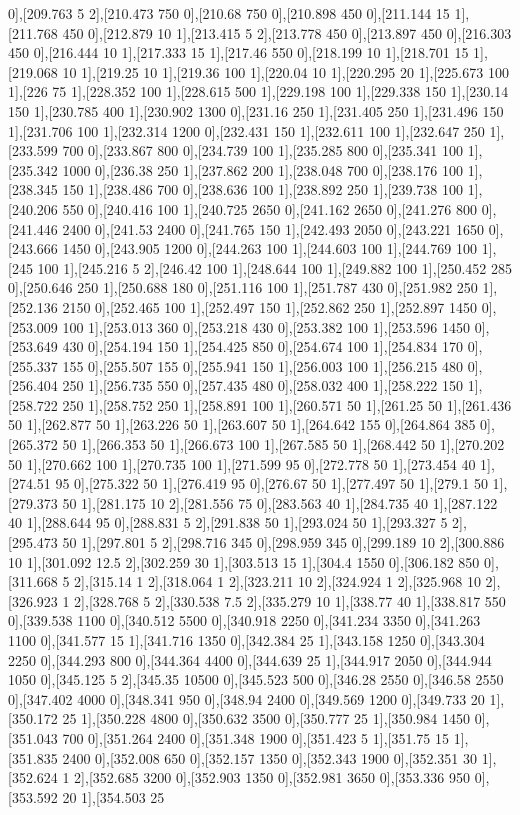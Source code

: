 {0],[209.763 5 2],[210.473 750 0],[210.68 750 0],[210.898 450 0],[211.144 15 1],[211.768 450 0],[212.879 10 1],[213.415 5 2],[213.778 450 0],[213.897 450 0],[216.303 450 0],[216.444 10 1],[217.333 15 1],[217.46 550 0],[218.199 10 1],[218.701 15 1],[219.068 10 1],[219.25 10 1],[219.36 100 1],[220.04 10 1],[220.295 20 1],[225.673 100 1],[226 75 1],[228.352 100 1],[228.615 500 1],[229.198 100 1],[229.338 150 1],[230.14 150 1],[230.785 400 1],[230.902 1300 0],[231.16 250 1],[231.405 250 1],[231.496 150 1],[231.706 100 1],[232.314 1200 0],[232.431 150 1],[232.611 100 1],[232.647 250 1],[233.599 700 0],[233.867 800 0],[234.739 100 1],[235.285 800 0],[235.341 100 1],[235.342 1000 0],[236.38 250 1],[237.862 200 1],[238.048 700 0],[238.176 100 1],[238.345 150 1],[238.486 700 0],[238.636 100 1],[238.892 250 1],[239.738 100 1],[240.206 550 0],[240.416 100 1],[240.725 2650 0],[241.162 2650 0],[241.276 800 0],[241.446 2400 0],[241.53 2400 0],[241.765 150 1],[242.493 2050 0],[243.221 1650 0],[243.666 1450 0],[243.905 1200 0],[244.263 100 1],[244.603 100 1],[244.769 100 1],[245 100 1],[245.216 5 2],[246.42 100 1],[248.644 100 1],[249.882 100 1],[250.452 285 0],[250.646 250 1],[250.688 180 0],[251.116 100 1],[251.787 430 0],[251.982 250 1],[252.136 2150 0],[252.465 100 1],[252.497 150 1],[252.862 250 1],[252.897 1450 0],[253.009 100 1],[253.013 360 0],[253.218 430 0],[253.382 100 1],[253.596 1450 0],[253.649 430 0],[254.194 150 1],[254.425 850 0],[254.674 100 1],[254.834 170 0],[255.337 155 0],[255.507 155 0],[255.941 150 1],[256.003 100 1],[256.215 480 0],[256.404 250 1],[256.735 550 0],[257.435 480 0],[258.032 400 1],[258.222 150 1],[258.722 250 1],[258.752 250 1],[258.891 100 1],[260.571 50 1],[261.25 50 1],[261.436 50 1],[262.877 50 1],[263.226 50 1],[263.607 50 1],[264.642 155 0],[264.864 385 0],[265.372 50 1],[266.353 50 1],[266.673 100 1],[267.585 50 1],[268.442 50 1],[270.202 50 1],[270.662 100 1],[270.735 100 1],[271.599 95 0],[272.778 50 1],[273.454 40 1],[274.51 95 0],[275.322 50 1],[276.419 95 0],[276.67 50 1],[277.497 50 1],[279.1 50 1],[279.373 50 1],[281.175 10 2],[281.556 75 0],[283.563 40 1],[284.735 40 1],[287.122 40 1],[288.644 95 0],[288.831 5 2],[291.838 50 1],[293.024 50 1],[293.327 5 2],[295.473 50 1],[297.801 5 2],[298.716 345 0],[298.959 345 0],[299.189 10 2],[300.886 10 1],[301.092 12.5 2],[302.259 30 1],[303.513 15 1],[304.4 1550 0],[306.182 850 0],[311.668 5 2],[315.14 1 2],[318.064 1 2],[323.211 10 2],[324.924 1 2],[325.968 10 2],[326.923 1 2],[328.768 5 2],[330.538 7.5 2],[335.279 10 1],[338.77 40 1],[338.817 550 0],[339.538 1100 0],[340.512 5500 0],[340.918 2250 0],[341.234 3350 0],[341.263 1100 0],[341.577 15 1],[341.716 1350 0],[342.384 25 1],[343.158 1250 0],[343.304 2250 0],[344.293 800 0],[344.364 4400 0],[344.639 25 1],[344.917 2050 0],[344.944 1050 0],[345.125 5 2],[345.35 10500 0],[345.523 500 0],[346.28 2550 0],[346.58 2550 0],[347.402 4000 0],[348.341 950 0],[348.94 2400 0],[349.569 1200 0],[349.733 20 1],[350.172 25 1],[350.228 4800 0],[350.632 3500 0],[350.777 25 1],[350.984 1450 0],[351.043 700 0],[351.264 2400 0],[351.348 1900 0],[351.423 5 1],[351.75 15 1],[351.835 2400 0],[352.008 650 0],[352.157 1350 0],[352.343 1900 0],[352.351 30 1],[352.624 1 2],[352.685 3200 0],[352.903 1350 0],[352.981 3650 0],[353.336 950 0],[353.592 20 1],[354.503 25 }
